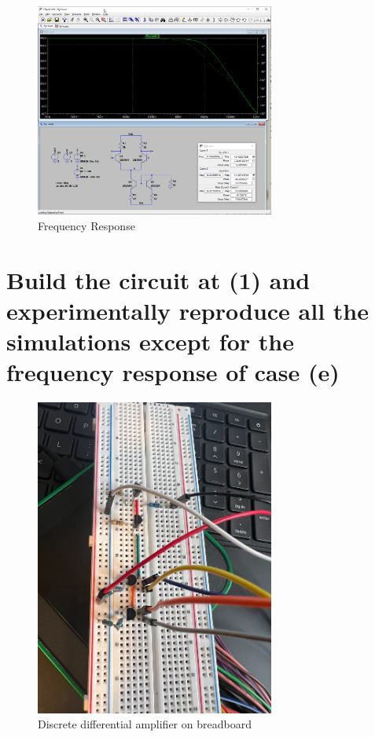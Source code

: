 \documentclass{article}
\begin{document}
	\begin{figure}[H]
	    \centering
	    \includegraphics[width=0.7\textwidth]{1e-2}
	    \caption{Frequency Response}
	\end{figure}

	\section{Build the circuit at (1) and experimentally reproduce all the simulations except for the frequency response of case (e)}
	
	\begin{figure}[H]
	    \centering
	    \includegraphics[width=0.7\textwidth]{breadboard}
	    \caption{Discrete differential amplifier on breadboard}
	\end{figure}
	
\end{document}
